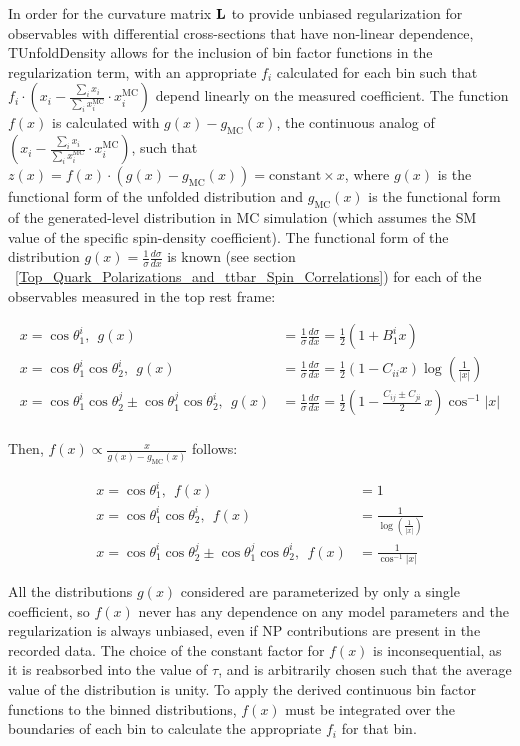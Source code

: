 \begin{refsection}
In order for the curvature matrix $\mathbf{L}$ to provide unbiased regularization for observables with differential cross-sections that have non-linear dependence, TUnfoldDensity allows for the inclusion of bin factor functions in the regularization term, with an appropriate $f_i$ calculated for each bin such that $f_i \cdot (x_i - \frac{\sum_i x_i}{\sum_i x^{\text{MC}}_i} \cdot x^{\text{MC}}_i)$ depend linearly on the measured coefficient. 
The function $f(x)$ is calculated with $g(x) - g_{\text{MC}}(x)$, the continuous analog of $(x_i - \frac{\sum_i x_i}{\sum_i x^{\text{MC}}_i} \cdot x^{\text{MC}}_i)$, such that $z(x) = f(x) \cdot (g(x) - g_{\text{MC}}(x)) = \mathrm{constant} \times x$, where $g(x)$ is the functional form of the unfolded distribution and $g_{\text{MC}}(x)$ is the functional form of the generated-level distribution in MC simulation (which assumes the SM value of the specific spin-density coefficient).
The functional form of the distribution $g(x) = \tfrac{1}{\sigma}\tfrac{d\sigma}{dx}$ is known (see section ~\ref{Top_Quark_Polarizations_and_ttbar_Spin_Correlations}) for each of the observables measured in the top rest frame:
\begin{linenomath*}
\begin{align}
x=\cos\theta_1^i, \:\: g(x) &= \frac{1}{\sigma}\frac{d\sigma}{dx} = \frac{1}{2} (1+B_1^{i} x) \\ 
x=\cos\theta_1^i\cos\theta_2^i, \:\: g(x) &= \frac{1}{\sigma}\frac{d\sigma}{dx} = \frac{1}{2} (1-C_{ii} x) \log \left(\frac{1}{\left \vert x \right \vert }\right) \\ 
x=\cos\theta_1^i\cos\theta_2^j\pm \cos\theta_1^j\cos\theta_2^i, \:\: g(x) &= \frac{1}{\sigma}\frac{d\sigma}{dx} = \frac{1}{2} \left( 1 - \frac{C_{ij} \pm C_{ji}}{2} \, x \right)  \cos ^{-1}\left \vert x \right \vert \\
\end{align}
\end{linenomath*}
Then, $f(x) \propto \frac{x}{g(x)-g_{\text{MC}}(x)}$ follows:
\begin{linenomath*}
\begin{align}
x=\cos\theta_1^i, \:\: f(x) &= 1 \\
x=\cos\theta_1^i\cos\theta_2^i, \:\: f(x) &= \frac{1}{\log \left(\frac{1}{\left\vert x \right \vert }\right)} \\
x=\cos\theta_1^i\cos\theta_2^j\pm \cos\theta_1^j\cos\theta_2^i, \:\: f(x) &=  \frac{1}{\cos ^{-1}\left \vert x \right \vert}
\end{align}
\end{linenomath*}
All the distributions $g(x)$ considered are parameterized by only a single coefficient, so $f(x)$ never has any dependence on any model parameters and the regularization is always unbiased, even if NP contributions are present in the recorded data. 
The choice of the constant factor for $f(x)$ is inconsequential, as it is reabsorbed into the value of $\tau$, and is arbitrarily chosen such that the average value of the distribution is unity.
To apply the derived continuous bin factor functions to the binned distributions, $f(x)$ must be integrated over the boundaries of each bin to calculate the appropriate $f_i$ for that bin. 


\end{refsection}
